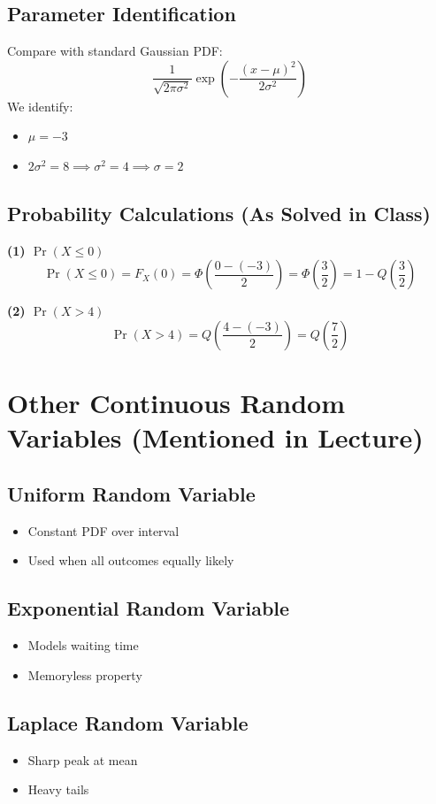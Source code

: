 \documentclass[11pt]{article}
\begin{document}
\subsection{Parameter Identification}
Compare with standard Gaussian PDF:
\[ \frac{1}{\sqrt{2\pi\sigma^2}} \exp\left( -\frac{(x-\mu)^2}{2\sigma^2} \right) \]
We identify:
\begin{itemize}
    \item $\mu = -3$
    \item $2\sigma^2 = 8 \implies \sigma^2 = 4 \implies \sigma = 2$
\end{itemize}

\subsection{Probability Calculations (As Solved in Class)}
\textbf{(1) $\Pr(X \le 0)$}
\[ \Pr(X \le 0) = F_X(0) = \Phi\left( \frac{0 - (-3)}{2} \right) = \Phi\left( \frac{3}{2} \right) = 1 - Q\left( \frac{3}{2} \right) \]

\textbf{(2) $\Pr(X > 4)$}
\[ \Pr(X > 4) = Q\left( \frac{4 - (-3)}{2} \right) = Q\left( \frac{7}{2} \right) \]

\section{Other Continuous Random Variables (Mentioned in Lecture)}

\subsection{Uniform Random Variable}
\begin{itemize}
    \item Constant PDF over interval
    \item Used when all outcomes equally likely
\end{itemize}

\subsection{Exponential Random Variable}
\begin{itemize}
    \item Models waiting time
    \item Memoryless property
\end{itemize}

\subsection{Laplace Random Variable}
\begin{itemize}
    \item Sharp peak at mean
    \item Heavy tails
\end{itemize}
\end{document}
